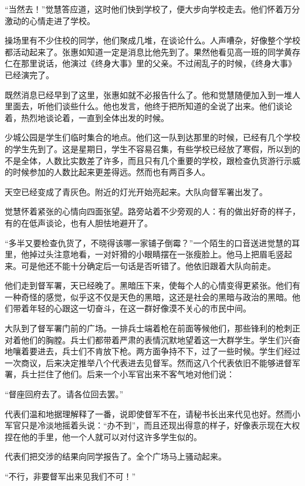 \par “当然去！”觉慧答应道，这时他们快到学校了，便大步向学校走去。他们怀着万分激动的心情走进了学校。
\par 操场里有不少住校的同学，他们聚成几堆，在谈论什么。人声嘈杂，好像整个学校都活动起来了。张惠如知道一定是消息比他先到了。果然他看见高一班的同学黄存仁在那里说话，他演过《终身大事》里的父亲。不过闹乱子的时候，《终身大事》已经演完了。
\par 既然消息已经早到了这里，张惠如就不必报告什么了。他和觉慧随便加入到一堆人里面去，听他们谈些什么。他也发言，他终于把所知道的全说了出来。他们谈论着，热烈地谈论着，一直到全体出发的时候。
\par 少城公园是学生们临时集合的地点。他们这一队到达那里的时候，已经有几个学校的学生先到了。这是星期日，学生不容易召集，有些学校已经放了寒假，所以到的不是全体，人数比实数差了许多，而且只有几个重要的学校，跟检查仇货游行示威的时候参加的人数比起来更差得远。然而也有两百多人。
\par 天空已经变成了青灰色。附近的灯光开始亮起来。大队向督军署出发了。
\par 觉慧怀着紧张的心情向四面张望。路旁站着不少旁观的人：有的做出好奇的样子，有的在低声谈论，也有人胆怯地避开了。
\par “多半又要检查仇货了，不晓得该哪一家铺子倒霉？”一个陌生的口音送进觉慧的耳里，他掉过头注意地看，一对奸猾的小眼睛摆在一张瘦脸上。他马上把眉毛竖起来。可是他还不能十分确定后一句话是否听错了。他依旧跟着大队向前走。
\par 他们走到督军署，天已经晚了。黑暗压下来，使每个人的心情变得更紧张。他们有一种奇怪的感觉，似乎这不仅是天色的黑暗，这还是社会的黑暗与政治的黑暗。他们带着年轻的心跟这一切奋斗，在这一群好像漠不关心的市民中间。
\par 大队到了督军署门前的广场。一排兵士端着枪在前面等候他们，那些锋利的枪刺正对着他们的胸膛。兵士们都带着严肃的表情沉默地望着这一大群学生。学生们兴奋地嚷着要进去，兵士们不肯放下枪。两方面争持不下，过了一些时候。学生们经过一次商议，后来决定推举八个代表进去见督军。然而这八个代表依旧不能够进督军署，兵士拦住了他们。后来一个小军官出来不客气地对他们说：
\par “督座回府去了。请各位回去罢。”
\par 代表们温和地据理解释了一番，说即使督军不在，请秘书长出来代见也好。然而小军官只是冷淡地摇着头说：“办不到”，而且还现出得意的样子，好像表示现在大权捏在他的手里，他一个人就可以对付这许多学生似的。
\par 代表们把交涉的结果向同学报告了。全个广场马上骚动起来。
\par “不行，非要督军出来见我们不可！”
